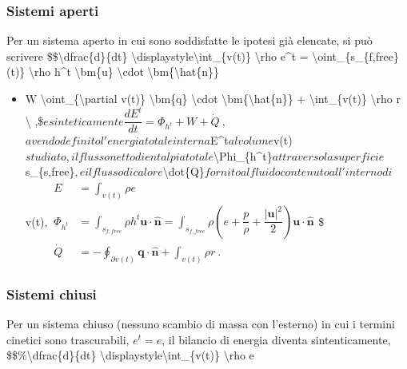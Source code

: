 \documentclass[letterpaper,10pt,italian]{jupyterBook}
\begin{document}
\subsubsection{Sistemi aperti}
\label{\detokenize{polimi/fluidmechanics-ita/template/capitoli/04_bilanci/0412in:sistemi-aperti}}
\sphinxAtStartPar
Per un sistema aperto in cui sono soddisfatte le ipotesi già elencate,
si può scrivere
\$\$\textbackslash{}dfrac\{d\}\{dt\} \textbackslash{}displaystyle\textbackslash{}int\_\{v(t)\} \textbackslash{}rho e\textasciicircum{}t = \sphinxhyphen{} \textbackslash{}oint\_\{s\_\{f,free\}(t)\} \textbackslash{}rho h\textasciicircum{}t \textbackslash{}bm\{u\} \textbackslash{}cdot \textbackslash{}bm\{\textbackslash{}hat\{n\}\}
\begin{itemize}
\item {} 
\sphinxAtStartPar
W \sphinxhyphen{} \textbackslash{}oint\_\{\textbackslash{}partial v(t)\} \textbackslash{}bm\{q\} \textbackslash{}cdot \textbackslash{}bm\{\textbackslash{}hat\{n\}\} + \textbackslash{}int\_\{v(t)\} \textbackslash{}rho r \textbackslash{} ,\$\(
e sinteticamente \)\(\dfrac{d E^t}{d t} = \Phi_{h^t} + W + \dot{Q} \ ,\)\(
avendo definito l'energia totale interna \)E\textasciicircum{}t\( al volume \)v(t)\(
studiato, il flusso netto di entalpia totale \)\textbackslash{}Phi\_\{h\textasciicircum{}t\}\( attraverso la
superficie \)s\_\{s,free\}\(, e il flusso di calore \)\textbackslash{}dot\{Q\}\( fornito al
fluido contenuto all'interno di \)v(t)\(, \)\(\begin{aligned}
E & = \int_{v(t)} \rho e \\
\Phi_{h^t} & = \int_{s_{f,free}} \rho h^t \bm{u} \cdot \bm{\hat{n}}
           = \int_{s_{f,free}} \rho \left( e + \dfrac{p}{\rho} + \dfrac{|\bm{u}|^2}{2} \right) \bm{u} \cdot \bm{\hat{n}} \\
\dot{Q} & = - \oint_{\partial v(t)} \bm{q} \cdot \bm{\hat{n}} + \int_{v(t)} \rho r \ . 
\end{aligned}\)\$

\end{itemize}


\subsubsection{Sistemi chiusi}
\label{\detokenize{polimi/fluidmechanics-ita/template/capitoli/04_bilanci/0412in:sistemi-chiusi}}
\sphinxAtStartPar
Per un sistema chiuso (nessuno scambio di massa con l’esterno) in cui i
termini cinetici sono trascurabili, \(e^t = e\), il bilancio di energia
diventa sintenticamente,
\$\$\%\textbackslash{}dfrac\{d\}\{dt\} \textbackslash{}displaystyle\textbackslash{}int\_\{v(t)\} \textbackslash{}rho e
\end{document}
